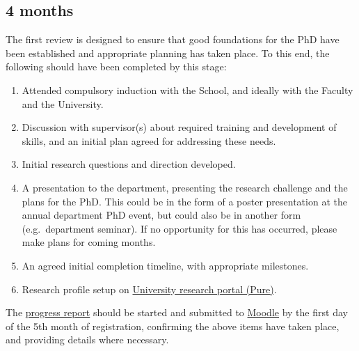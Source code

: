 \documentclass[12pt,a4paper]{article}
\begin{document}
\subsection{4 months} \label{sec:4months}
The first review is designed to ensure that good foundations for the PhD have been established and appropriate planning has taken place. To this end, the following should have been completed by this stage:
\begin{enumerate}
	\item Attended compulsory induction with the School, and ideally with the Faculty and the University.
	\item Discussion with supervisor(s) about required training and development of skills, and an initial plan agreed for addressing these needs.
	\item Initial research questions and direction developed.
	\item A presentation to the department, presenting the research challenge and the plans for the PhD. This could be in the form of a poster presentation at the annual department PhD event, but could also be in another form (e.g.\ department seminar). If no opportunity for this has occurred, please make plans for coming months.
	\item An agreed initial completion timeline, with appropriate milestones.
	\item Research profile setup on \href{https://pure.lancs.ac.uk}{University research portal (Pure)}.
\end{enumerate}

The \hyperref[sec:report]{progress report} should be started and submitted to \href{https://modules.lancaster.ac.uk/course/view.php?id=7050}{Moodle} by the first day of the 5th month of registration, confirming the above items have taken place, and providing details where necessary.
\end{document}
